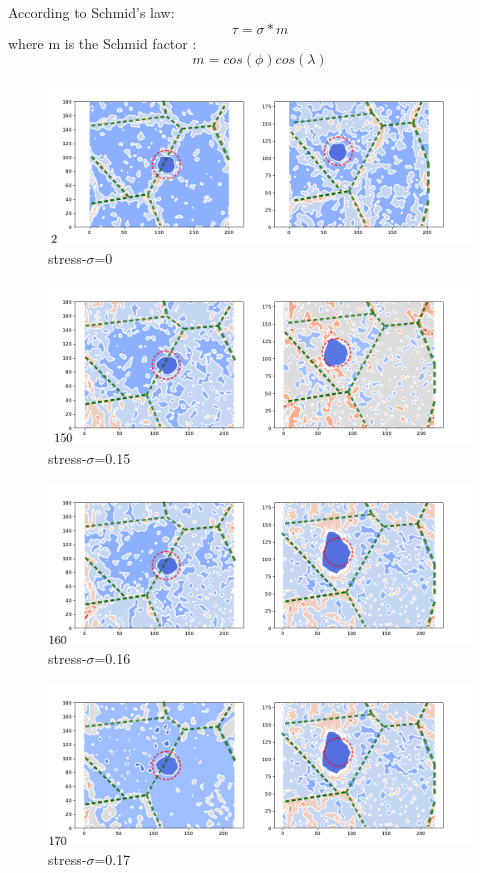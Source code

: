 \documentclass[final,5pt,times]{elsarticle}
\begin{document}
	According to Schmid's law:
	$$\tau = \sigma*m$$
	where m is the Schmid factor :
	$$ m = cos(\phi)cos(\lambda)$$
	\begin{figure}[h]
		\centering
		\includegraphics[width=0.7\linewidth]{img/frame2}
		\caption{stress-$\sigma$=0}
		\label{ }
	\end{figure}
	
	\begin{figure}[h]
		\centering
		\includegraphics[width=0.7\linewidth]{img/frame150}
		\caption{stress-$\sigma$=0.15}
		\label{ }
	\end{figure}
	
	\begin{figure}[h]
		\centering
		\includegraphics[width=0.7\linewidth]{img/frame160}
		\caption{stress-$\sigma$=0.16}
		\label{ }
	\end{figure}
	
	\begin{figure}[h]
		\centering
		\includegraphics[width=0.7\linewidth]{img/frame170}
		\caption{stress-$\sigma$=0.17}
		\label{ }
	\end{figure}
	
\end{document}
